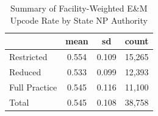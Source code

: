 \begin{table}[htbp]\centering
\def\sym#1{\ifmmode^{#1}\else\(^{#1}\)\fi}
\caption{Summary of Facility-Weighted E\&M Upcode Rate by State NP Authority}
\begin{tabular}{l*{1}{ccc}}
\toprule
                    &        mean&          sd&       count\\
\midrule
Restricted          &       0.554&       0.109&      15,265\\
Reduced             &       0.533&       0.099&      12,393\\
Full Practice       &       0.545&       0.116&      11,100\\
Total               &       0.545&       0.108&      38,758\\
\bottomrule
\end{tabular}
\end{table}
